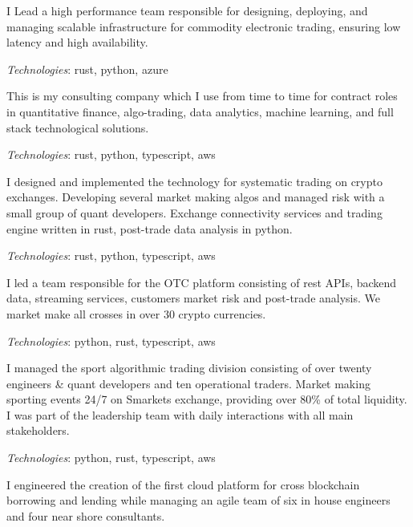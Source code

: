 
I Lead a high performance team responsible for designing, deploying, and managing scalable infrastructure
for commodity electronic trading, ensuring low latency and high availability.

{\it Technologies}: rust, python, azure


This is my consulting company which I use from time to time for contract roles in quantitative finance,
algo-trading, data analytics, machine learning, and full stack technological solutions.

{\it Technologies}: rust, python, typescript, aws


I designed and implemented the technology for systematic trading on crypto exchanges.
Developing several market making algos and managed risk with a small group of quant developers.
Exchange connectivity services and trading engine written in rust, post-trade data analysis in python.

{\it Technologies}: rust, python, typescript, aws


I led a team responsible for the OTC platform consisting of rest APIs,
backend data, streaming services, customers market risk and post-trade analysis.
We market make all crosses in over 30 crypto currencies.

{\it Technologies}: python, rust, typescript, aws


I managed the sport algorithmic trading division consisting of over twenty engineers \& quant developers and ten operational traders.
Market making sporting events 24/7 on Smarkets exchange, providing over 80\% of total liquidity.
I was part of the leadership team with daily interactions with all main stakeholders.

{\it Technologies}: python, rust, typescript, aws


I engineered the creation of the first cloud platform for cross blockchain borrowing and lending
while managing an agile team of six in house engineers and four near shore consultants.

